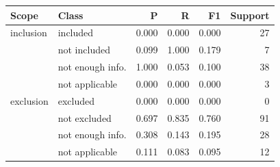 \begin{tabular}{llrrrr}\toprule
Scope & Class & P & R & F1 & Support \\\midrule
inclusion & included & 0.000 & 0.000 & 0.000 & 27 \\
 & not included & 0.099 & 1.000 & 0.179 & 7 \\
 & not enough info. & 1.000 & 0.053 & 0.100 & 38 \\
 & not applicable & 0.000 & 0.000 & 0.000 & 3 \\
\midrule
exclusion & excluded & 0.000 & 0.000 & 0.000 & 0 \\
 & not excluded & 0.697 & 0.835 & 0.760 & 91 \\
 & not enough info. & 0.308 & 0.143 & 0.195 & 28 \\
 & not applicable & 0.111 & 0.083 & 0.095 & 12 \\
\bottomrule\end{tabular}
